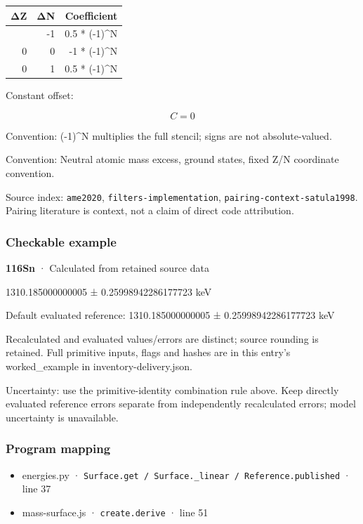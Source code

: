 \documentclass[
  11pt,
  letterpaper,
]{article}
\providecommand{\tightlist}{%
  \setlength{\itemsep}{0pt}\setlength{\parskip}{0pt}}
\begin{document}
\begin{longtable}[]{@{}rrr@{}}
\toprule\noalign{}
ΔZ & ΔN & Coefficient \\
\midrule\noalign{}
\endhead
\bottomrule\noalign{}
\endlastfoot
0 & -1 & 0.5 * (-1)\^{}N \\
0 & 0 & -1 * (-1)\^{}N \\
0 & 1 & 0.5 * (-1)\^{}N \\
\end{longtable}

Constant offset:

\[
C=0
\]

Convention: (-1)\^{}N multiplies the full stencil; signs are not
absolute-valued.

Convention: Neutral atomic mass excess, ground states, fixed Z/N
coordinate convention.

Source index: \texttt{ame2020}, \texttt{filters-implementation},
\texttt{pairing-context-satula1998}. Pairing literature is context, not
a claim of direct code attribution.

\subsubsection{Checkable example}\label{checkable-example-22}

\textbf{116Sn} · Calculated from retained source data

1310.185000000005 ± 0.25998942286177723 keV

Default evaluated reference: 1310.185000000005 ± 0.25998942286177723 keV

Recalculated and evaluated values/errors are distinct; source rounding
is retained. Full primitive inputs, flags and hashes are in this entry's
worked\_example in inventory-delivery.json.

Uncertainty: use the primitive-identity combination rule above. Keep
directly evaluated reference errors separate from independently
recalculated errors; model uncertainty is unavailable.

\subsubsection{Program mapping}\label{program-mapping-22}

\begin{itemize}
\tightlist
\item
  energies.py ·
  \texttt{Surface.get\ /\ Surface.\_linear\ /\ Reference.published} ·
  line 37
\item
  mass-surface.js · \texttt{create.derive} · line 51
\end{itemize}
\end{document}
